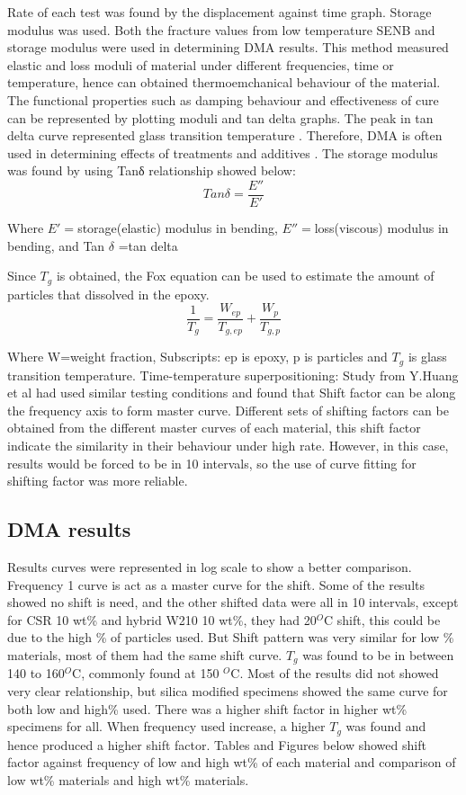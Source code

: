 \documentclass[numbers=noendperiod,chapterprefix=on]{icldt} %
\begin{document}
Rate of each test was found by the displacement against time graph. Storage modulus was used. Both the fracture values from low temperature SENB and storage modulus were used in determining DMA results.
This method measured elastic and loss moduli of material under different frequencies, time or temperature, hence can obtained thermoemchanical behaviour of the material. The functional properties such as damping behaviour and effectiveness of cure can be represented by plotting moduli and tan delta graphs. The peak in tan delta curve represented glass transition temperature \cite{D50232007}. Therefore, DMA is often used in determining effects of treatments and additives \cite{D50232007}.
The storage modulus was found by using Tanδ relationship showed below:
\begin{equation} 
Tan\delta=\frac{E''}{E'}
\end{equation}

Where $E'=$storage(elastic) modulus in bending,
$E''=$loss(viscous) modulus in bending,
 and
Tan $\delta$ =tan delta

Since $T_g$ is obtained, the Fox equation can be used to estimate the amount of particles that dissolved in the epoxy.
\begin{equation} 
\frac{1}{T_g}=\frac{W_{ep}}{T_{g,ep}} + \frac{W_p}{T_{g,p}} 
\end{equation}

Where W=weight fraction,
Subscripts: ep is epoxy, p is particles
and $ T_{g} $ is glass transition temperature.
\newline
Time-temperature superpositioning:
Study from Y.Huang et al \cite{Huang1993} had used similar testing conditions and found that Shift factor can be along the frequency axis to form master curve.
Different sets of shifting factors can be obtained from the different master curves of each material, this shift factor indicate the similarity in their behaviour under high rate.
However, in this case, results would be forced to be in 10 intervals, so the use of curve fitting for shifting factor was more reliable.

\subsection{DMA results}
Results curves were represented in log scale to show a better comparison. Frequency 1 curve is act as a master curve for the shift. Some of the results showed no shift is need, and the other shifted data were all in 10 intervals, except for CSR 10 wt\% and hybrid W210 10 wt\%, they had 20$^O$C shift, this could be due to the high \% of particles used. But Shift pattern was very similar for low \% materials, most of them had the same shift curve. $ T_{g} $ was found to be in between 140 to 160$^O$C, commonly found at 150 $^O$C.
Most of the results did not showed very clear relationship, but silica modified specimens showed the same curve for both low and high\% used. There was a higher shift factor in higher wt\% specimens for all. When frequency used increase, a higher $T_g$ was found and hence produced a higher shift factor.
Tables and Figures below showed shift factor against frequency of low and high wt\% of each material and comparison of low wt\% materials and high wt\% materials.
\end{document}
